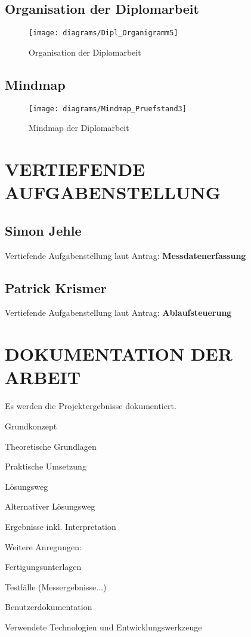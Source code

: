 \documentclass[12pt,a4paper]{article}
\newcommand{\yhbu}[0]{\color{ydkbu}}	%
\begin{document}
\subsection{Organisation der Diplomarbeit}
\begin{figure}[h!]
	\centering
	\texttt{[image: diagrams/Dipl\_Organigramm5]}
	\caption{Organisation der Diplomarbeit}
\end{figure}
%
%
\newpage
\subsection{Mindmap}
\begin{figure}[h!]
	\centering
	\texttt{[image: diagrams/Mindmap\_Pruefstand3]}
	\caption{Mindmap der Diplomarbeit}
\end{figure}
%
%
\newpage
\section{VERTIEFENDE AUFGABENSTELLUNG}
 \subsection{Simon Jehle}
Vertiefende Aufgabenstellung laut Antrag: {\bf Messdatenerfassung}
%
 \subsection{Patrick Krismer}
Vertiefende Aufgabenstellung laut Antrag: {\bf Ablaufsteuerung}


\newpage
\section{DOKUMENTATION DER ARBEIT}
   {\yhbu
	Es werden die Projektergebnisse dokumentiert.
	\begin{itemize*}
	\item	Grundkonzept
	\item	Theoretische Grundlagen
	\item	Praktische Umsetzung
	\item	Lösungsweg
	\item	Alternativer Lösungsweg
	\item	Ergebnisse inkl. Interpretation
	\end{itemize*}
	Weitere Anregungen:
	\begin{itemize*}
	\item	Fertigungsunterlagen
	\item	Testfälle (Messergebnisse...)
	\item	Benutzerdokumentation
	\item	Verwendete Technologien und Entwicklungswerkzeuge
	\end{itemize*}
   }%
%
%
\newpage
\end{document}
